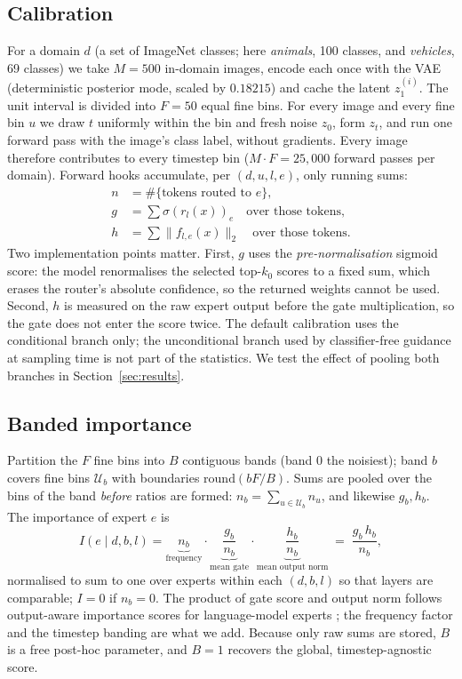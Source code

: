 \subsection{Calibration}\label{sec:calib}
For a domain $d$ (a set of ImageNet classes; here \emph{animals}, 100 classes, and \emph{vehicles}, 69 classes) we take $M=500$ in-domain images, encode each once with the VAE (deterministic posterior mode, scaled by $0.18215$) and cache the latent $z_1^{(i)}$.
The unit interval is divided into $F=50$ equal fine bins. For every image and every fine bin $u$ we draw $t$ uniformly within the bin and fresh noise $z_0$, form $z_t$, and run one forward pass with the image's class label, without gradients.
Every image therefore contributes to every timestep bin ($M\cdot F=25{,}000$ forward passes per domain).
Forward hooks accumulate, per $(d,u,l,e)$, only running sums:
\begin{align*}
n &= \#\{\text{tokens routed to } e\},\\
g &= \textstyle\sum \sigma(r_{l}(x))_e \quad\text{over those tokens},\\
h &= \textstyle\sum \lVert f_{l,e}(x)\rVert_2 \quad\text{over those tokens}.
\end{align*}
Two implementation points matter. First, $g$ uses the \emph{pre-normalisation} sigmoid score: the model renormalises the selected top-$k_0$ scores to a fixed sum, which erases the router's absolute confidence, so the returned weights cannot be used. Second, $h$ is measured on the raw expert output before the gate multiplication, so the gate does not enter the score twice.
The default calibration uses the conditional branch only; the unconditional branch used by classifier-free guidance \citep{ho2022cfg} at sampling time is not part of the statistics. We test the effect of pooling both branches in Section~\ref{sec:results}.

\subsection{Banded importance}\label{sec:score}
Partition the $F$ fine bins into $B$ contiguous bands (band $0$ the noisiest); band $b$ covers fine bins $\mathcal{U}_b$ with boundaries $\mathrm{round}(bF/B)$.
Sums are pooled over the bins of the band \emph{before} ratios are formed: $n_b=\sum_{u\in\mathcal{U}_b}n_u$, and likewise $g_b,h_b$.
The importance of expert $e$ is
\begin{equation}
I(e\mid d,b,l)=\underbrace{n_b}_{\text{frequency}}\cdot\underbrace{\frac{g_b}{n_b}}_{\text{mean gate}}\cdot\underbrace{\frac{h_b}{n_b}}_{\text{mean output norm}}
\;=\;\frac{g_b\,h_b}{n_b},
\end{equation}
normalised to sum to one over experts within each $(d,b,l)$ so that layers are comparable; $I=0$ if $n_b=0$.
The product of gate score and output norm follows output-aware importance scores for language-model experts \citep{dong2025easyep,lasby2025reap}; the frequency factor and the timestep banding are what we add. Because only raw sums are stored, $B$ is a free post-hoc parameter, and $B=1$ recovers the global, timestep-agnostic score.

